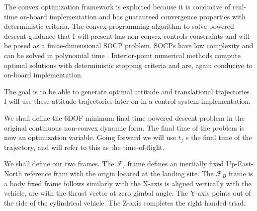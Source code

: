 The convex optimization framework is exploited because it is conducive of real-time on-board implementation and has guaranteed convergence properties with deterministic criteria. The convex programming algorithm to solve powered descent guidance that I will present has non-convex controls constraints and will be posed as a finite-dimensional SOCP problem. SOCPs have low complexity and can be solved in polynomial time \cite{boyd}. Interior-point numerical methods compute optimal solutions with deterministic stopping criteria and are, again conducive to on-board implementation. 


The goal is to be able to generate optimal attitude and translational trajectories. I will use these attitude trajectories later on in a control system implementation.

We shall define the 6DOF minimum final time powered descent problem in the original continuous non-convex dynamic form. The final time of the problem is now an optimization variable. Going forward we will use $t_f$ s the final time of the trajectory, and will refer to this as the time-of-flight.

We shall define our two frames. The $\mathcal{F}_I$ frame defines an inertially fixed Up-East-North reference fram with the origin located at the landing site. The $\mathcal{F}_B$ frame is a body fixed frame follows similarly with the X-axis is aligned vertically with the vehicle, are with the thrust vector at zero gimbal angle. The Y-axis points out of the side of the cylindrical vehicle. The Z-axis completes the right handed triad.

















